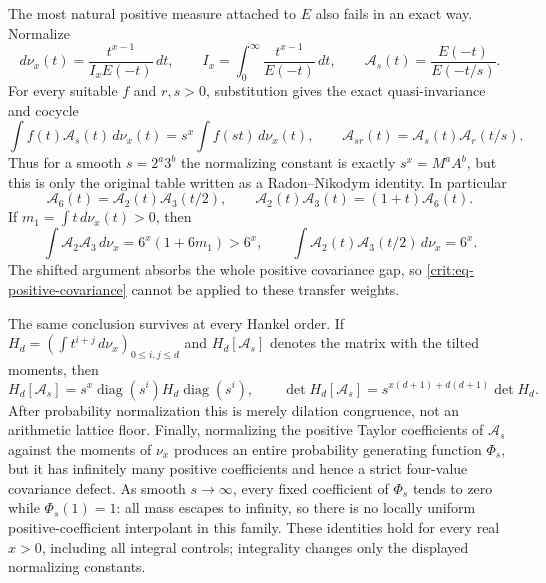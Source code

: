 \documentclass[11pt,oneside]{article}
\theoremstyle{definition}
\theoremstyle{remark}
\begin{document}
The most natural positive measure attached to $E$ also fails in an exact way.  Normalize
\begin{equation}
 d\nu_x(t)=\frac{t^{x-1}}{I_xE(-t)}\,dt,
 \qquad I_x=\int_0^\infty\frac{t^{x-1}}{E(-t)}\,dt,
 \qquad
 \mathcal A_s(t)=\frac{E(-t)}{E(-t/s)}.
 \label{crit:eq-stieltjes-transfer-measure}
\end{equation}
For every suitable $f$ and $r,s>0$, substitution gives the exact quasi-invariance and
cocycle
\begin{equation}
 \int f(t)\mathcal A_s(t)\,d\nu_x(t)
 =s^x\int f(st)\,d\nu_x(t),
 \qquad
 \mathcal A_{sr}(t)=\mathcal A_s(t)\mathcal A_r(t/s).
 \label{crit:eq-stieltjes-transfer}
\end{equation}
Thus for a smooth $s=2^a3^b$ the normalizing constant is exactly $s^x=M^aA^b$, but this is
only the original table written as a Radon--Nikodym identity.  In particular
\begin{equation}
 \mathcal A_6(t)=\mathcal A_2(t)\mathcal A_3(t/2),\qquad
 \mathcal A_2(t)\mathcal A_3(t)=(1+t)\mathcal A_6(t).
 \label{crit:eq-stieltjes-transfer-corner}
\end{equation}
If $m_1=\int t\,d\nu_x(t)>0$, then
\begin{equation}
 \int\mathcal A_2\mathcal A_3\,d\nu_x
 =6^x(1+6m_1)>6^x,\qquad
 \int\mathcal A_2(t)\mathcal A_3(t/2)\,d\nu_x=6^x.
 \label{crit:eq-stieltjes-transfer-gap}
\end{equation}
The shifted argument absorbs the whole positive covariance gap, so
\eqref{crit:eq-positive-covariance} cannot be applied to these transfer weights.

The same conclusion survives at every Hankel order.  If
$H_d=(\int t^{i+j}\,d\nu_x)_{0\le i,j\le d}$ and $H_d[\mathcal A_s]$ denotes the matrix with
the tilted moments, then
\begin{equation}
 H_d[\mathcal A_s]=s^x\operatorname{diag}(s^i)H_d\operatorname{diag}(s^i),
 \qquad
 \det H_d[\mathcal A_s]=s^{x(d+1)+d(d+1)}\det H_d.
 \label{crit:eq-stieltjes-transfer-hankel}
\end{equation}
After probability normalization this is merely dilation congruence, not an arithmetic
lattice floor.  Finally, normalizing the positive Taylor coefficients of
$\mathcal A_s$ against the moments of $\nu_x$ produces an entire probability generating
function $\Phi_s$, but it has infinitely many positive coefficients and hence a strict
four-value covariance defect.  As smooth $s\to\infty$, every fixed coefficient of
$\Phi_s$ tends to zero while $\Phi_s(1)=1$: all mass escapes to infinity, so there is no
locally uniform positive-coefficient interpolant in this family.  These identities hold for
every real $x>0$, including all integral controls; integrality changes only the displayed
normalizing constants.
\end{document}
